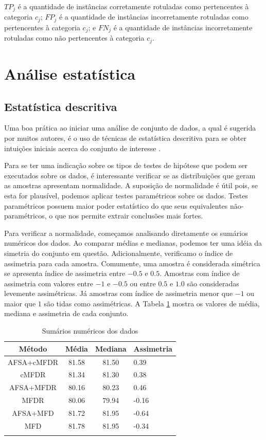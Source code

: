 \documentclass[conference]{IEEEtran}
\begin{document}
$TP_j$ é a quantidade de instâncias corretamente rotuladas como pertencentes à categoria $c_j$; $FP_j$ é a quantidade de instâncias incorretamente rotuladas como pertencentes à categoria $c_j$; e $FN_j$ é a quantidade de instâncias incorretamente rotuladas como não pertencentes à categoria $c_j$. 

\section{Análise estatística}
\label{sec:analise}

\subsection{Estatística descritiva}
\label{sec:estat_descr}

Uma boa prática ao iniciar uma análise de conjunto de dados, a qual é sugerida por muitos autores, é o uso de técnicas de estatística descritiva para se obter intuições iniciais acerca do conjunto de interesse \cite{montgomery2010applied}.

Para se ter uma indicação sobre os tipos de testes de hipótese que podem ser executados sobre os dados, é interessante verificar se as distribuições que geram as amostras apresentam normalidade.
A suposição de normalidade é útil pois, se esta for plausível, podemos aplicar testes paramétricos sobre os dados.
Testes paramétricos possuem maior poder estatístico do que seus equivalentes não-paramétricos, o que nos permite extrair conclusões mais fortes.

Para verificar a normalidade, começamos analisando diretamente os sumários numéricos dos dados.
Ao comparar médias e medianas, podemos ter uma idéia da simetria do conjunto em questão.
Adicionalmente, verificamo o índice de assimetria para cada amostra. Comumente, uma amostra é considerada simétrica se apresenta índice de assimetria entre $-0.5$ e $0.5$. Amostras com índice de assimetria com valores entre $-1$ e $-0.5$ ou entre $0.5$ e $1.0$ são consideradas levemente assimétricas. Já amostras com índice de assimetria menor que $-1$ ou maior que $1$ são tidas como assimétricas.  A Tabela \ref{tab:est_descr} mostra os valores de média, mediana e assimetria de cada conjunto. 

\begin{table}[h]
	\centering
	\caption{Sumários numéricos dos dados}
	\label{tab:est_descr}
	\begin{tabular}{c|ccl}
		Método 	& Média & Mediana & Assimetria\\
		\hline
		AFSA+cMFDR 	& 81.58 & 81.50 & 0.39 \\
		cMFDR & 81.34 	& 81.30 & 0.38 \\
		AFSA+MFDR & 80.16 & 80.23 & 0.46 \\
		MFDR & 80.06 & 79.94 & -0.16 \\
		AFSA+MFD & 81.72 & 81.95 & -0.64 \\
		MFD & 81.78 & 81.95 & -0.34 \\
		\hline& 
	\end{tabular}
\end{table}
\end{document}
